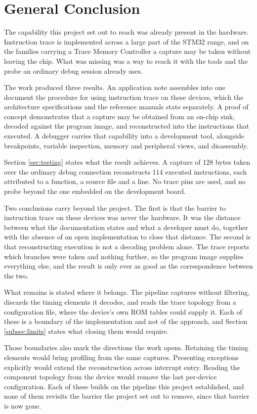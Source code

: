 \chapter*{General Conclusion}
{}

The capability this project set out to reach was already present in the hardware. Instruction trace is implemented across a large part of the STM32 range, and on the families carrying a Trace Memory Controller a capture may be taken without leaving the chip. What was missing was a way to reach it with the tools and the probe an ordinary debug session already uses.

The work produced three results. An application note assembles into one document the procedure for using instruction trace on these devices, which the architecture specifications and the reference manuals state separately. A proof of concept demonstrates that a capture may be obtained from an on-chip sink, decoded against the program image, and reconstructed into the instructions that executed. A debugger carries that capability into a development tool, alongside breakpoints, variable inspection, memory and peripheral views, and disassembly.

Section \ref{sec:testing} states what the result achieves. A capture of 128 bytes taken over the ordinary debug connection reconstructs 114 executed instructions, each attributed to a function, a source file and a line. No trace pins are used, and no probe beyond the one embedded on the development board.

Two conclusions carry beyond the project. The first is that the barrier to instruction trace on these devices was never the hardware. It was the distance between what the documentation states and what a developer must do, together with the absence of an open implementation to close that distance. The second is that reconstructing execution is not a decoding problem alone. The trace reports which branches were taken and nothing further, so the program image supplies everything else, and the result is only ever as good as the correspondence between the two.

What remains is stated where it belongs. The pipeline captures without filtering, discards the timing elements it decodes, and reads the trace topology from a configuration file, where the device's own ROM tables could supply it. Each of these is a boundary of the implementation and not of the approach, and Section \ref{subsec:limits} states what closing them would require.

Those boundaries also mark the directions the work opens. Retaining the timing elements would bring profiling from the same captures. Presenting exceptions explicitly would extend the reconstruction across interrupt entry. Reading the component topology from the device would remove the last per-device configuration. Each of these builds on the pipeline this project established, and none of them revisits the barrier the project set out to remove, since that barrier is now gone.
